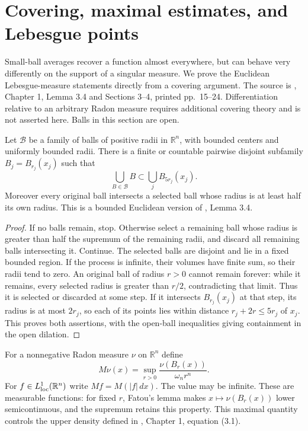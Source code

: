 \chapter{Covering, maximal estimates, and Lebesgue points}\label{sec:measure-differentiation}
Small-ball averages recover a function almost everywhere, but can behave very differently on the support of a singular measure. We prove the Euclidean Lebesgue-measure statements directly from a covering argument. The source is \cite{Sim18}, Chapter 1, Lemma 3.4 and Sections 3--4, printed pp.~15--24. Differentiation relative to an arbitrary Radon measure requires additional covering theory and is not asserted here. Balls in this section are open.

\begin{lemma}\label{lem:bounded-fivefold-covering}
Let $\mathcal B$ be a family of balls of positive radii in $\mathbb R^n$, with bounded centers and uniformly bounded radii. There is a finite or countable pairwise disjoint subfamily $B_j=B_{r_j}(x_j)$ such that
\[
 \bigcup_{B\in\mathcal B}B\subset\bigcup_j B_{5r_j}(x_j).
\]
Moreover every original ball intersects a selected ball whose radius is at least half its own radius. This is a bounded Euclidean version of \cite{Sim18}, Lemma 3.4.
\end{lemma}
\begin{proof}
If no balls remain, stop. Otherwise select a remaining ball whose radius is greater than half the supremum of the remaining radii, and discard all remaining balls intersecting it. Continue. The selected balls are disjoint and lie in a fixed bounded region. If the process is infinite, their volumes have finite sum, so their radii tend to zero. An original ball of radius $r>0$ cannot remain forever: while it remains, every selected radius is greater than $r/2$, contradicting that limit. Thus it is selected or discarded at some step. If it intersects $B_{r_j}(x_j)$ at that step, its radius is at most $2r_j$, so each of its points lies within distance $r_j+2r\leq5r_j$ of $x_j$. This proves both assertions, with the open-ball inequalities giving containment in the open dilation.
\end{proof}

\begin{definition}\label{def:centered-maximal-function}
For a nonnegative Radon measure $\nu$ on $\mathbb R^n$ define
\[
 M\nu(x)=\sup_{r>0}\frac{\nu(B_r(x))}{\omega_n r^n}.
\]
For $f\in L^1_{\rm loc}(\mathbb R^n)$ write $Mf=M(|f|\,dx)$. The value may be infinite. These are measurable functions: for fixed $r$, Fatou's lemma makes $x\mapsto\nu(B_r(x))$ lower semicontinuous, and the supremum retains this property. This maximal quantity controls the upper density defined in \cite{Sim18}, Chapter 1, equation (3.1).
\end{definition}

